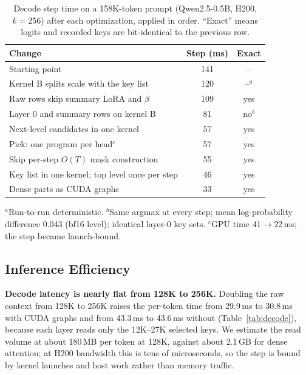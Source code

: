 \documentclass[10pt,twocolumn]{article}
\newcommand{\para}[1]{\noindent\textbf{#1}\hspace{0.5em}}
\begin{document}
\begin{table}[t]
\caption{Decode step time on a 158K-token prompt (Qwen2.5-0.5B, H200, $k=256$) after each
optimization, applied in order. ``Exact'' means logits and recorded keys are bit-identical to
the previous row.}
\label{tab:decode_steps}
\centering\small
\begin{tabular}{p{4.7cm}cc}
\toprule
Change & Step (ms) & Exact \\
\midrule
Starting point & 141 & -- \\
Kernel B splits scale with the key list & 120 & --$^{a}$ \\
Raw rows skip summary LoRA and $\beta$ & 109 & yes \\
Layer 0 and summary rows on kernel B & 81 & no$^{b}$ \\
Next-level candidates in one kernel & 57 & yes \\
Pick: one program per head$^{c}$ & 57 & yes \\
Skip per-step $O(T)$ mask construction & 55 & yes \\
Key list in one kernel; top level once per step & 46 & yes \\
Dense parts as CUDA graphs & 33 & yes \\
\bottomrule
\end{tabular}

\vspace{2pt}
\raggedright\footnotesize
$^{a}$Run-to-run deterministic. $^{b}$Same argmax at every step; mean log-probability
difference 0.043 (bf16 level); identical layer-0 key sets. $^{c}$GPU time 41$\to$22\,ms; the
step became launch-bound.
\end{table}

\subsection{Inference Efficiency}

\para{Decode latency is nearly flat from 128K to 256K.}
Doubling the raw context from 128K to 256K raises the per-token time from 29.9\,ms to 30.8\,ms
with CUDA graphs and from 43.3\,ms to 43.6\,ms without (Table~\ref{tab:decode}), because each
layer reads only the 12K--27K selected keys. We estimate the read volume at about 180\,MB per
token at 128K, against about 2.1\,GB for dense attention; at H200 bandwidth this is tens of
microseconds, so the step is bound by kernel launches and host work rather than memory traffic.
\end{document}
